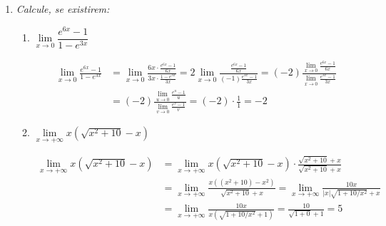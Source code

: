 \documentclass[12pt,a4paper]{article}
\begin{document}
\begin{enumerate}
\begin{enumerate}
\end{enumerate}

\item \textit{ Calcule, se existirem:}
\begin{enumerate}
\item $\lim\limits_{x\to 0} \dfrac{e^{6x}-1}{1-e^{3x}}$

\begin{align*}
\lim\limits_{x\to 0} \frac{e^{6x}-1}{1-e^{3x}}
& = \lim\limits_{x\to 0} \frac{6x \cdot \frac{e^{6x}-1}{6x}}{3x \cdot \frac{1-e^{3x}}{3x}}
  = 2\lim\limits_{x\to 0} \frac{\frac{e^{6x}-1}{6x}}{(-1)\frac{e^{3x}-1}{3x}}
  = (-2)\frac{\lim\limits_{x\to 0} \frac{e^{6x}-1}{6x}}{\lim\limits_{x\to 0} \frac{e^{3x}-1}{3x}} \\
& = (-2)\frac{\lim\limits_{u\to 0} \frac{e^{u}-1}{u}}{\lim\limits_{v\to 0} \frac{e^{v}-1}{v}}
  = (-2) \cdot \frac{1}{1}
  = -2
\end{align*}

\item $\lim\limits_{x\to +\infty} x(\sqrt{x^2 + 10} - x)$

\begin{align*}
\lim\limits_{x\to +\infty} x(\sqrt{x^2 + 10} - x)
& = \lim\limits_{x\to +\infty} x(\sqrt{x^2 + 10} - x) \cdot \frac{\sqrt{x^2 + 10} + x}{\sqrt{x^2 + 10} + x} \\
& = \lim\limits_{x\to +\infty} \frac{x((x^2 + 10) - x^2)}{\sqrt{x^2 + 10} + x}
  = \lim\limits_{x\to +\infty} \frac{10 x}{|x|\sqrt{1 + 10/x^2} + x} \\
& = \lim\limits_{x\to +\infty} \frac{10 x}{x (\sqrt{1 + 10/x^2} + 1)}
  = \frac{10}{\sqrt{1 + 0} + 1}
  = 5
\end{align*}


\end{enumerate}
\end{enumerate}
\end{document}
